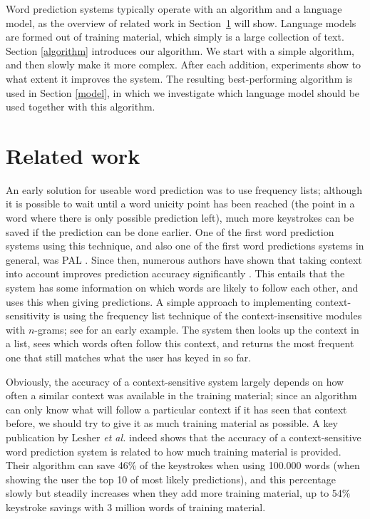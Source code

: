 \documentclass[11pt]{article}
\begin{document}
Word prediction systems typically operate with an algorithm and a language model, as the overview of related work in Section~\ref{related} will show. Language models are formed out of training material, which simply is a large collection of text. Section \ref{algorithm} introduces our algorithm. We start with a simple algorithm, and then slowly make it more complex. After each addition, experiments show to what extent it improves the system. The resulting best-performing algorithm is used in Section \ref{model}, in which we investigate which language model should be used together with this algorithm. 

\section{Related work}
\label{related}

An early solution for useable word prediction was to use frequency lists; although it is possible to wait until a word unicity point has been reached (the point in a word where there is only possible prediction left), much more keystrokes can be saved if the prediction can be done earlier. One of the first word prediction systems using this technique, and also one of the first word predictions systems in general, was PAL \cite{swiffin+85}.  Since then, numerous authors have shown that taking context into account improves prediction accuracy significantly \cite{Lesher+99,Garay-Vitoria+06,Tanaka-Ishii07,vandenbosch+08}. This entails that the system has some information on which words are likely to follow each other, and uses this when giving predictions. A simple approach to implementing context-sensitivity is using the frequency list technique of the context-insensitive modules with $n$-grams;  see \cite{hunnicutt87} for an early example. The system then looks up the context in a list, sees which words often follow this context, and returns the most frequent one that still matches what the user has keyed in so far.

Obviously, the accuracy of a context-sensitive system largely depends on how often a similar context was available in the training material; since an algorithm can only know what will follow a particular context if it has seen that context before, we should try to give it as much training material as possible. A key publication by Lesher {\em et al.}  indeed shows that the accuracy of a context-sensitive word prediction system is related to how much training material is provided. Their algorithm can save 46\% of the keystrokes when using 100.000 words (when showing the user the top 10 of most likely predictions), and this percentage slowly but steadily increases when they add more training material, up to 54\% keystroke savings with 3 million words of training material.
\end{document}
